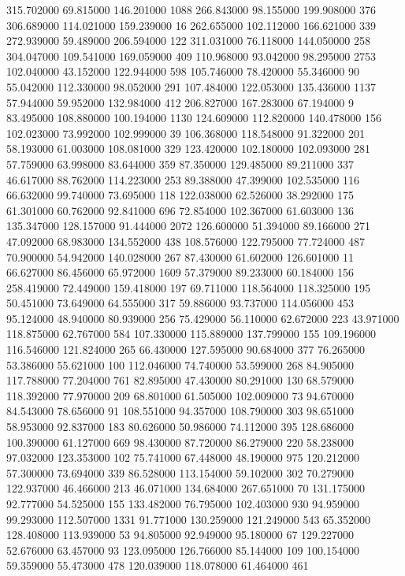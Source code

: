 315.702000	69.815000	146.201000	1088
266.843000	98.155000	199.908000	376
306.689000	114.021000	159.239000	16
262.655000	102.112000	166.621000	339
272.939000	59.489000	206.594000	122
311.031000	76.118000	144.050000	258
304.047000	109.541000	169.059000	409
110.968000	93.042000	98.295000	2753
102.040000	43.152000	122.944000	598
105.746000	78.420000	55.346000	90
55.042000	112.330000	98.052000	291
107.484000	122.053000	135.436000	1137
57.944000	59.952000	132.984000	412
206.827000	167.283000	67.194000	9
83.495000	108.880000	100.194000	1130
124.609000	112.820000	140.478000	156
102.023000	73.992000	102.999000	39
106.368000	118.548000	91.322000	201
58.193000	61.003000	108.081000	329
123.420000	102.180000	102.093000	281
57.759000	63.998000	83.644000	359
87.350000	129.485000	89.211000	337
46.617000	88.762000	114.223000	253
89.388000	47.399000	102.535000	116
66.632000	99.740000	73.695000	118
122.038000	62.526000	38.292000	175
61.301000	60.762000	92.841000	696
72.854000	102.367000	61.603000	136
135.347000	128.157000	91.444000	2072
126.600000	51.394000	89.166000	271
47.092000	68.983000	134.552000	438
108.576000	122.795000	77.724000	487
70.900000	54.942000	140.028000	267
87.430000	61.602000	126.601000	11
66.627000	86.456000	65.972000	1609
57.379000	89.233000	60.184000	156
258.419000	72.449000	159.418000	197
69.711000	118.564000	118.325000	195
50.451000	73.649000	64.555000	317
59.886000	93.737000	114.056000	453
95.124000	48.940000	80.939000	256
75.429000	56.110000	62.672000	223
43.971000	118.875000	62.767000	584
107.330000	115.889000	137.799000	155
109.196000	116.546000	121.824000	265
66.430000	127.595000	90.684000	377
76.265000	53.386000	55.621000	100
112.046000	74.740000	53.599000	268
84.905000	117.788000	77.204000	761
82.895000	47.430000	80.291000	130
68.579000	118.392000	77.970000	209
68.801000	61.505000	102.009000	73
94.670000	84.543000	78.656000	91
108.551000	94.357000	108.790000	303
98.651000	58.953000	92.837000	183
80.626000	50.986000	74.112000	395
128.686000	100.390000	61.127000	669
98.430000	87.720000	86.279000	220
58.238000	97.032000	123.353000	102
75.741000	67.448000	48.190000	975
120.212000	57.300000	73.694000	339
86.528000	113.154000	59.102000	302
70.279000	122.937000	46.466000	213
46.071000	134.684000	267.651000	70
131.175000	92.777000	54.525000	155
133.482000	76.795000	102.403000	930
94.959000	99.293000	112.507000	1331
91.771000	130.259000	121.249000	543
65.352000	128.408000	113.939000	53
94.805000	92.949000	95.180000	67
129.227000	52.676000	63.457000	93
123.095000	126.766000	85.144000	109
100.154000	59.359000	55.473000	478
120.039000	118.078000	61.464000	461
